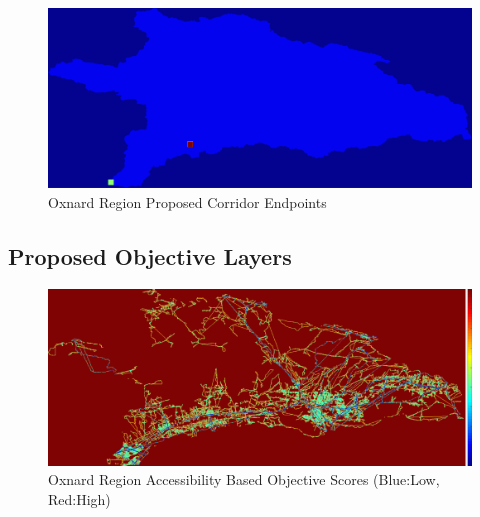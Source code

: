         \begin{figure}[!h]
            \begin{center}
            \includegraphics[width=5.5in]{figures/Oxnard_Endpoints.png}   
            \caption{Oxnard Region Proposed Corridor Endpoints}
            \label{fig:Oendpoints}
            \end{center}
        \end{figure}
            
    \subsection{Proposed Objective Layers}

        \begin{figure}[!h]
            \begin{center}
            \includegraphics[width=5.5in]{figures/Oxnard_AccessibilityScore.png}   
            \caption{Oxnard Region Accessibility Based Objective Scores (Blue:Low, Red:High)}
            \label{fig:Oaccessibilty}
            \end{center}
        \end{figure}

